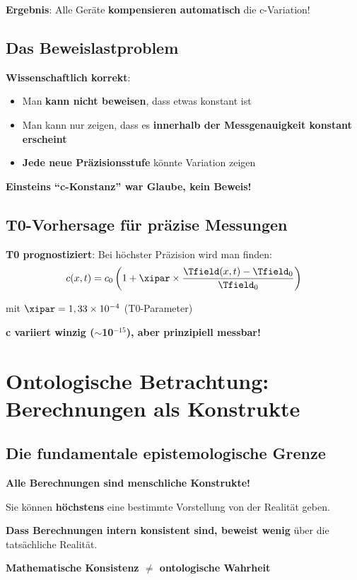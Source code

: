 	\textbf{Ergebnis}: Alle Geräte \textbf{kompensieren automatisch} die c-Variation!
	
	\subsection{Das Beweislastproblem}
	
	\textbf{Wissenschaftlich korrekt}:
	\begin{itemize}
		\item Man \textbf{kann nicht beweisen}, dass etwas konstant ist
		\item Man kann nur zeigen, dass es \textbf{innerhalb der Messgenauigkeit konstant erscheint}
		\item \textbf{Jede neue Präzisionsstufe} könnte Variation zeigen
	\end{itemize}
	
	\textbf{Einsteins ``c-Konstanz'' war Glaube, kein Beweis!}
	
	\subsection{T0-Vorhersage für präzise Messungen}
	
	\textbf{T0 prognostiziert}: Bei höchster Präzision wird man finden:
	\begin{equation}
		c(x,t) = c_0 \left(1 + \xipar \times \frac{\Tfield(x,t) - \Tfield_0}{\Tfield_0}\right)
	\end{equation}
	
	mit $\xipar = 1,33 \times 10^{-4}$ (T0-Parameter)
	
	\textbf{c variiert winzig ($\sim$10$^{-15}$), aber prinzipiell messbar!}
	
	\section{Ontologische Betrachtung: Berechnungen als Konstrukte}
	
	\subsection{Die fundamentale epistemologische Grenze}
	
	\begin{tcolorbox}[colback=purple!5!white,colframe=purple!75!black,title=Ontologische Wahrheit]
		\textbf{Alle Berechnungen sind menschliche Konstrukte!}
		
		Sie können \textbf{höchstens} eine bestimmte Vorstellung von der Realität geben.
		
		\textbf{Dass Berechnungen intern konsistent sind, beweist wenig} über die tatsächliche Realität.
		
		\textbf{Mathematische Konsistenz $\neq$ ontologische Wahrheit}
	\end{tcolorbox}
	
